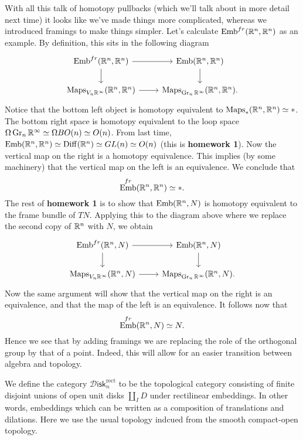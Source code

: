 \documentclass{amsart}
\DeclareMathOperator{\Emb}{Emb}
\newcommand{\Diskr}{\mathscr{D}\mathsf{isk}_n^\text{rect}}
\begin{document}
With all this talk of homotopy pullbacks (which we'll talk about in more detail
next time)
it looks like we've made things more complicated, whereas we introduced framings
to make things simpler.
Let's calculate $\Emb^{fr}(\R^n, \R^n)$ as an example.
By definition, this sits in the following diagram
\begin{equation*}
    \begin{tikzcd}
        \Emb^{fr}(\R^n, \R^n) \rar\dar & \Emb(\R^n, \R^n)\dar \\
        \Maps_{V_n\R^\infty}(\R^n, \R^n) \rar & \Maps_{\Gr_n\R^\infty}(\R^n,\R^n).
    \end{tikzcd}
\end{equation*}
Notice that the bottom left object is homotopy equivalent to $\operatorname{Maps}_*(\mathbb{R}^n,\mathbb{R}^n)\simeq *$.
The bottom right space is homotopy equivalent to the loop space $\Omega\operatorname{Gr}_n\mathbb{R}^\infty\simeq \Omega BO(n)\simeq O(n)$.
From last time, $\Emb(\R^n,\R^n)\simeq \Diff(\R^n)\simeq GL(n)\simeq O(n)$ (this is
\textbf{homework 1}). Now the vertical map on the right is a homotopy equivalence.
This implies (by some machinery) that the vertical map on the left is an equivalence.
We conclude that
\begin{equation*}
    \Emb^{fr}(\R^n,\R^n)\simeq *.
\end{equation*}
The rest of \textbf{homework 1} is to
show that $\Emb(\R^n, N)$ is homotopy equivalent to the frame bundle of $TN$. Applying this
to the diagram above where we replace the second copy of $\mathbb{R}^n$ with $N$, we obtain
\begin{equation*}
    \begin{tikzcd}
        \Emb^{fr}(\R^n, N) \rar\dar & \Emb(\R^n, N)\dar \\
        \Maps_{V_n\R^\infty}(\R^n, N) \rar & \Maps_{\Gr_n\R^\infty}(\R^n,N).
    \end{tikzcd}
\end{equation*}
Now the same argument will show that the vertical map on the right is an equivalence,
and that the map of the left is an equivalence. It follows now that
\begin{equation*}
    \Emb^{fr}(\R^n,N)\simeq N.
\end{equation*}
Hence we see that by adding framings we are replacing the role of the orthogonal group
by that of a point. Indeed, this will allow for an easier transition between algebra and topology.
\begin{definition}
    We define the category $\Diskr$ to be the topological category consisting of 
    finite disjoint unions of open unit disks $\coprod_I D$ under rectilinear
    embeddings. In other words, embeddings which can be written as a composition
    of translations and dilations. Here we use the usual topology indcued from
    the smooth compact-open topology.
\end{definition}
\end{document}
